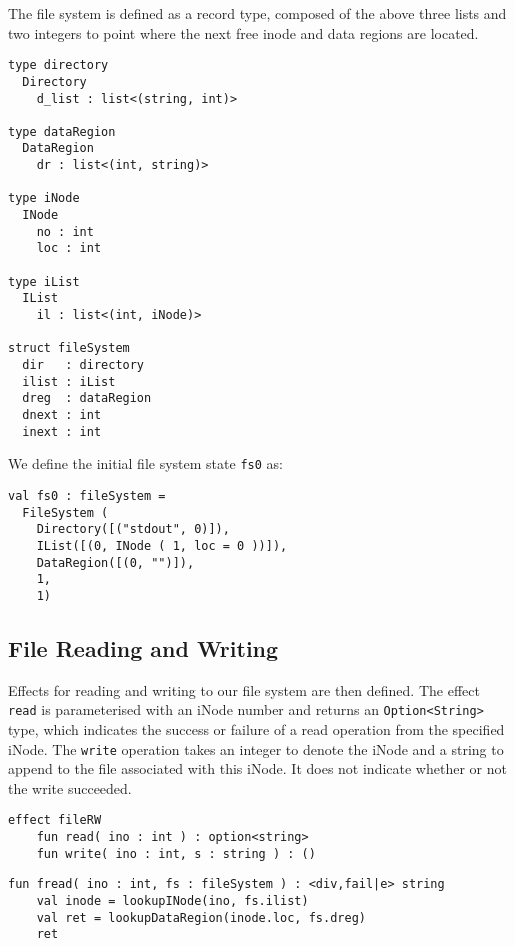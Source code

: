 \documentclass[logo,bsc,singlespacing,parskip]{infthesis}
\begin{document}
The file system is defined as a record type, composed of the above three lists and two integers to point where the next free inode and data regions are located.

\begin{lstlisting}
type directory 
  Directory
    d_list : list<(string, int)>

type dataRegion 
  DataRegion
    dr : list<(int, string)>

type iNode
  INode
    no : int
    loc : int

type iList 
  IList
    il : list<(int, iNode)> 

struct fileSystem
  dir   : directory
  ilist : iList
  dreg  : dataRegion
  dnext : int
  inext : int

\end{lstlisting}

We define the initial file system state \texttt{fs0} as:
\begin{lstlisting}
val fs0 : fileSystem =
  FileSystem (
    Directory([("stdout", 0)]),
    IList([(0, INode ( 1, loc = 0 ))]),
    DataRegion([(0, "")]),
    1,
    1)
\end{lstlisting}

\subsection{File Reading and Writing}

Effects for reading and writing to our file system are then defined. The effect \lstinline{read} is parameterised with an iNode number and returns an \lstinline{Option<String>} type, which indicates the success or failure of a read operation from the specified iNode. The \lstinline{write} operation takes an integer to denote the iNode and a string to append to the file associated with this iNode. It does not indicate whether or not the write succeeded.

\begin{lstlisting}
effect fileRW
    fun read( ino : int ) : option<string>
    fun write( ino : int, s : string ) : ()
\end{lstlisting}



\begin{lstlisting}
fun fread( ino : int, fs : fileSystem ) : <div,fail|e> string
    val inode = lookupINode(ino, fs.ilist)
    val ret = lookupDataRegion(inode.loc, fs.dreg)
    ret
\end{lstlisting}
\end{document}
